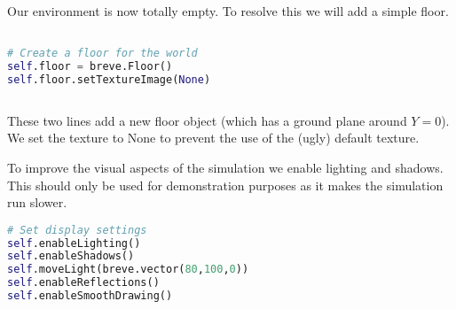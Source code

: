 Our environment is now totally empty. To resolve this we will add a simple floor.


\begin{lstlisting}[language=Python]

# Create a floor for the world
self.floor = breve.Floor()
self.floor.setTextureImage(None)
            
\end{lstlisting}

These two lines add a new floor object (which has a ground plane around $Y=0$). We set the texture to None to prevent the use of the (ugly) default texture.

To improve the visual aspects of the simulation we enable lighting and shadows. This should only be used for demonstration purposes as it makes the simulation run slower.


\begin{lstlisting}[language=Python]
# Set display settings
self.enableLighting()
self.enableShadows()
self.moveLight(breve.vector(80,100,0))
self.enableReflections()
self.enableSmoothDrawing()
\end{lstlisting}